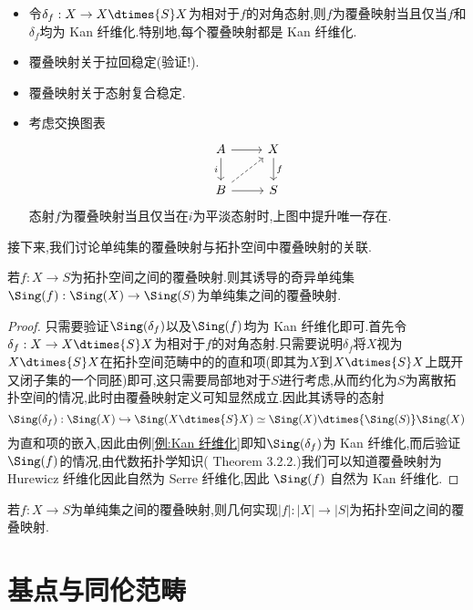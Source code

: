 \begin{remark}
    \begin{itemize}
        \item 令$\delta_f : X \to X\dtimes{S} X$为相对于$f$的对角态射,则$f$为覆叠映射当且仅当$f$和$\delta_f$均为 Kan 纤维化.特别地,每个覆叠映射都是 Kan 纤维化.
        \item 覆叠映射关于拉回稳定(验证!).
        \item 覆叠映射关于态射复合稳定.
        \item 考虑交换图表
        \[\begin{tikzcd}
        A & X \\
	B & S
	\arrow[from=1-1, to=1-2]
	\arrow["i"', from=1-1, to=2-1]
	\arrow["f", from=1-2, to=2-2]
	\arrow[dashed, from=2-1, to=1-2]
	\arrow[from=2-1, to=2-2]
        \end{tikzcd}\]
        态射$f$为覆叠映射当且仅当在$i$为平淡态射时,上图中提升唯一存在.
    \end{itemize}
\end{remark}
接下来,我们讨论单纯集的覆叠映射与拓扑空间中覆叠映射的关联.
\begin{proposition}
    若$f:X\to S$为拓扑空间之间的覆叠映射.则其诱导的奇异单纯集$\Sing(f):\Sing(X) \to \Sing(S)$为单纯集之间的覆叠映射.
\end{proposition}
\begin{proof}
    只需要验证$\Sing(\delta_f)$以及$\Sing(f)$均为 Kan 纤维化即可.首先令$\delta_f: X \to X\dtimes{S}X$为相对于$f$的对角态射.只需要说明$\delta_f$将$X$视为$X\dtimes{S} X$在拓扑空间范畴中的的直和项(即其为$X$到$X\dtimes{S} X$上既开又闭子集的一个同胚)即可,这只需要局部地对于$S$进行考虑,从而约化为$S$为离散拓扑空间的情况,此时由覆叠映射定义可知显然成立.因此其诱导的态射
    \[
        \Sing(\delta_f) : \Sing(X) \hookrightarrow \Sing(X\dtimes{S} X)\simeq \Sing(X) \dtimes{\Sing(S)}\Sing(X)
    \]
    为直和项的嵌入,因此由例\ref{例:Kan 纤维化}即知$\Sing(\delta_f)$为 Kan 纤维化,而后验证$\Sing(f)$的情况,由代数拓扑学知识(\cite{TomDieck} Theorem 3.2.2.)我们可以知道覆叠映射为 Hurewicz 纤维化因此自然为 Serre 纤维化,因此 $\Sing(f)$ 自然为 Kan 纤维化.
\end{proof}
\begin{proposition}
    若$f:X \to S$为单纯集之间的覆叠映射,则几何实现$|f|: |X| \to |S|$为拓扑空间之间的覆叠映射.
\end{proposition}
\section{基点与同伦范畴}

